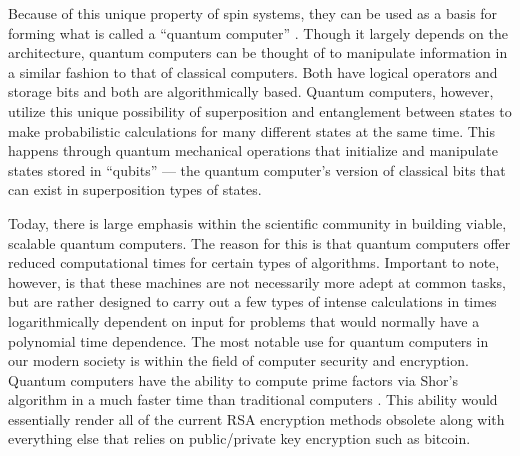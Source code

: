 \documentclass[oneside, noacknowlegments]{BYUPhys}
\begin{document}
Because of this unique property of spin systems, they can be used as a basis for forming what is called a ``quantum computer'' \cite{RefWorks:doc:58929746e4b0dec22aee3a9a}. Though it largely depends on the architecture, quantum computers can be thought of to manipulate information in a similar fashion to that of classical computers. Both have logical operators and storage bits and both are algorithmically based. Quantum computers, however, utilize this unique possibility of superposition and entanglement between states to make probabilistic calculations for many different states at the same time. This happens through quantum mechanical operations that initialize and manipulate states stored in ``qubits'' --- the quantum computer's version of classical bits that can exist in superposition types of states.

Today, there is large emphasis within the scientific community in building viable, scalable quantum computers. The reason for this is that quantum computers offer reduced computational times for certain types of algorithms. Important to note, however, is that these machines are not necessarily more adept at common tasks, but are rather designed to carry out a few types of intense calculations in times logarithmically dependent on input for problems that would normally have a polynomial time dependence. The most notable use for quantum computers in our modern society is within the field of computer security and encryption. Quantum computers have the ability to compute prime factors via Shor's algorithm in a much faster time than traditional computers \cite{RefWorks:doc:589296c6e4b0d4c09201f6f5}. This ability would essentially render all of the current RSA encryption methods obsolete along with everything else that relies on public/private key encryption such as bitcoin.
\end{document}
